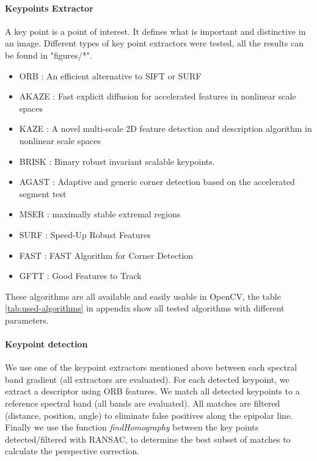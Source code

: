 \documentclass[]{elsarticle}
\begin{document}
	\paragraph{Keypoints Extractor}
	A key point is a point of interest. It defines what is important and distinctive in an image.
	Different types of key point extractors were tested, all the results can be found in "figures/*".
	
	\pagebreak
	\begin{itemize}
		\item ORB : An efficient alternative to SIFT or SURF
		\item AKAZE : Fast explicit diffusion for accelerated features in nonlinear scale spaces
		\item KAZE : A novel multi-scale 2D feature detection and description algorithm in nonlinear scale spaces \cite{rs10050756}
		\item BRISK : Binary robust invariant scalable keypoints.
		\item AGAST : Adaptive and generic corner detection based on the accelerated segment test
		\item MSER : maximally stable extremal regions
		\item SURF : Speed-Up Robust Features
		\item FAST : FAST Algorithm for Corner Detection
		\item GFTT : Good Features to Track
	\end{itemize}

	These algorithms are all available and easily usable in OpenCV, the table \ref{tab:used-algorithms} in appendix
	show all tested algorithms with different parameters.
	
	\paragraph{Keypoint detection}
	We use one of the keypoint extractors mentioned above between each spectral band gradient (all extractors are evaluated).
	For each detected keypoint, we extract a descriptor using ORB features.
	We match all detected keypoints to a reference spectral band (all bands are evaluated).
	All matches are filtered (distance, position, angle) to eliminate false positives along the epipolar line.
	Finally we use the function \textit{findHomography} between the key points detected/filtered with RANSAC,
	to determine the best subset of matches to calculate the perspective correction.
	
	
\end{document}
